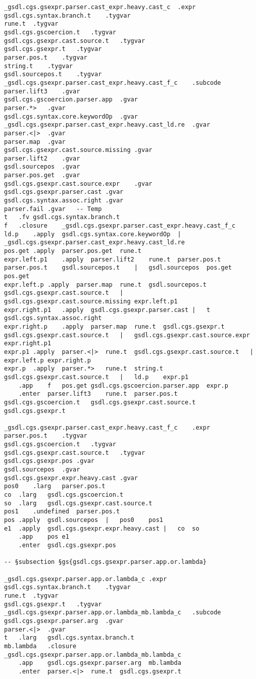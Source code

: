 \documentclass{report}
\begin{document}
\begin{verbatim}
_gsdl.cgs.gsexpr.parser.cast_expr.heavy.cast_c	.expr
gsdl.cgs.syntax.branch.t	.tygvar
rune.t	.tygvar
gsdl.cgs.gscoercion.t	.tygvar
gsdl.cgs.gsexpr.cast.source.t	.tygvar
gsdl.cgs.gsexpr.t	.tygvar
parser.pos.t	.tygvar
string.t	.tygvar
gsdl.sourcepos.t	.tygvar
_gsdl.cgs.gsexpr.parser.cast_expr.heavy.cast_f_c	.subcode
parser.lift3	.gvar
gsdl.cgs.gscoercion.parser.app	.gvar
parser.*>	.gvar
gsdl.cgs.syntax.core.keywordOp	.gvar
_gsdl.cgs.gsexpr.parser.cast_expr.heavy.cast_ld.re	.gvar
parser.<|>	.gvar
parser.map	.gvar
gsdl.cgs.gsexpr.cast.source.missing	.gvar
parser.lift2	.gvar
gsdl.sourcepos	.gvar
parser.pos.get	.gvar
gsdl.cgs.gsexpr.cast.source.expr	.gvar
gsdl.cgs.gsexpr.parser.cast	.gvar
gsdl.cgs.syntax.assoc.right	.gvar
parser.fail	.gvar	-- Temp
t	.fv	gsdl.cgs.syntax.branch.t
f	.closure	_gsdl.cgs.gsexpr.parser.cast_expr.heavy.cast_f_c
ld.p	.apply	gsdl.cgs.syntax.core.keywordOp	|	_gsdl.cgs.gsexpr.parser.cast_expr.heavy.cast_ld.re
pos.get	.apply	parser.pos.get	rune.t
expr.left.p1	.apply	parser.lift2	rune.t	parser.pos.t	parser.pos.t	gsdl.sourcepos.t	|	gsdl.sourcepos	pos.get	pos.get
expr.left.p	.apply	parser.map	rune.t	gsdl.sourcepos.t	gsdl.cgs.gsexpr.cast.source.t	|	gsdl.cgs.gsexpr.cast.source.missing	expr.left.p1
expr.right.p1	.apply	gsdl.cgs.gsexpr.parser.cast	|	t	gsdl.cgs.syntax.assoc.right
expr.right.p	.apply	parser.map	rune.t	gsdl.cgs.gsexpr.t	gsdl.cgs.gsexpr.cast.source.t	|	gsdl.cgs.gsexpr.cast.source.expr	expr.right.p1
expr.p1	.apply	parser.<|>	rune.t	gsdl.cgs.gsexpr.cast.source.t	|	expr.left.p	expr.right.p
expr.p	.apply	parser.*>	rune.t	string.t	gsdl.cgs.gsexpr.cast.source.t	|	ld.p	expr.p1
	.app	f	pos.get	gsdl.cgs.gscoercion.parser.app	expr.p
	.enter	parser.lift3	rune.t	parser.pos.t	gsdl.cgs.gscoercion.t	gsdl.cgs.gsexpr.cast.source.t	gsdl.cgs.gsexpr.t

_gsdl.cgs.gsexpr.parser.cast_expr.heavy.cast_f_c	.expr
parser.pos.t	.tygvar
gsdl.cgs.gscoercion.t	.tygvar
gsdl.cgs.gsexpr.cast.source.t	.tygvar
gsdl.cgs.gsexpr.pos	.gvar
gsdl.sourcepos	.gvar
gsdl.cgs.gsexpr.expr.heavy.cast	.gvar
pos0	.larg	parser.pos.t
co	.larg	gsdl.cgs.gscoercion.t
so	.larg	gsdl.cgs.gsexpr.cast.source.t
pos1	.undefined	parser.pos.t
pos	.apply	gsdl.sourcepos	|	pos0	pos1
e1	.apply	gsdl.cgs.gsexpr.expr.heavy.cast	|	co	so
	.app	pos	e1
	.enter	gsdl.cgs.gsexpr.pos

-- §subsection §gs{gsdl.cgs.gsexpr.parser.app.or.lambda}

_gsdl.cgs.gsexpr.parser.app.or.lambda_c	.expr
gsdl.cgs.syntax.branch.t	.tygvar
rune.t	.tygvar
gsdl.cgs.gsexpr.t	.tygvar
_gsdl.cgs.gsexpr.parser.app.or.lambda_mb.lambda_c	.subcode
gsdl.cgs.gsexpr.parser.arg	.gvar
parser.<|>	.gvar
t	.larg	gsdl.cgs.syntax.branch.t
mb.lambda	.closure	_gsdl.cgs.gsexpr.parser.app.or.lambda_mb.lambda_c
	.app	gsdl.cgs.gsexpr.parser.arg	mb.lambda
	.enter	parser.<|>	rune.t	gsdl.cgs.gsexpr.t


\end{verbatim}
\end{document}
